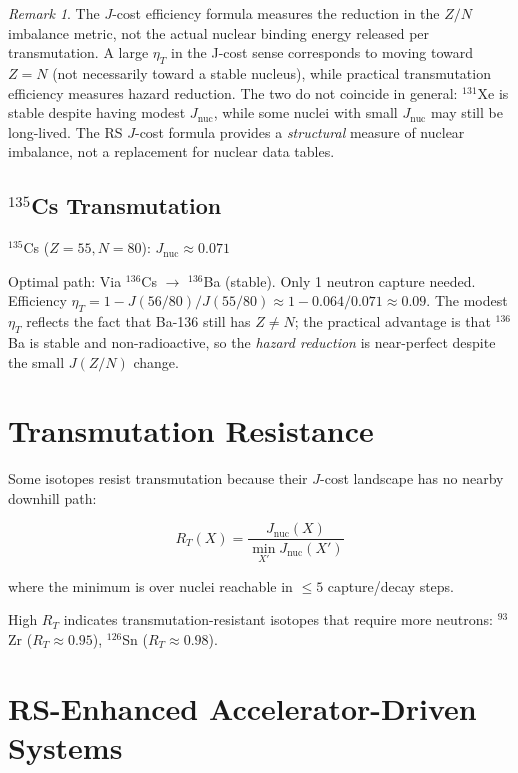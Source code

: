 \documentclass[12pt,a4paper]{article}
\theoremstyle{definition}
\theoremstyle{remark}
\newtheorem{remark}[theorem]{Remark}
\begin{document}
\begin{remark}
The $J$-cost efficiency formula measures the reduction in the $Z/N$ imbalance
metric, not the actual nuclear binding energy released per transmutation.
A large $\eta_T$ in the J-cost sense corresponds to moving toward $Z = N$
(not necessarily toward a stable nucleus), while practical transmutation
efficiency measures hazard reduction.  The two do not coincide in general:
$^{131}$Xe is stable despite having modest $J_\mathrm{nuc}$, while some
nuclei with small $J_\mathrm{nuc}$ may still be long-lived.  The RS
$J$-cost formula provides a \emph{structural} measure of nuclear imbalance,
not a replacement for nuclear data tables.
\end{remark}

\subsection{${}^{135}$Cs Transmutation}

${}^{135}$Cs ($Z=55, N=80$): $J_\mathrm{nuc} \approx 0.071$

Optimal path: Via ${}^{136}$Cs $\to$ ${}^{136}$Ba (stable). Only 1 neutron capture needed.
Efficiency $\eta_T = 1 - J(56/80)/J(55/80) \approx 1 - 0.064/0.071 \approx 0.09$.
The modest $\eta_T$ reflects the fact that Ba-136 still has $Z \neq N$;
the practical advantage is that ${}^{136}$Ba is stable and non-radioactive,
so the \emph{hazard reduction} is near-perfect despite the small
$J(Z/N)$ change.

\section{Transmutation Resistance}

Some isotopes resist transmutation because their $J$-cost landscape has no nearby 
downhill path:

\begin{equation}
R_T(X) = \frac{J_\mathrm{nuc}(X)}{\min_{X'} J_\mathrm{nuc}(X')}
\end{equation}

where the minimum is over nuclei reachable in $\leq 5$ capture/decay steps.

High $R_T$ indicates transmutation-resistant isotopes that require more neutrons:
${}^{93}$Zr ($R_T \approx 0.95$), ${}^{126}$Sn ($R_T \approx 0.98$).

\section{RS-Enhanced Accelerator-Driven Systems}
\end{document}
